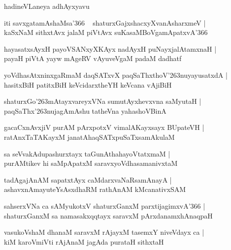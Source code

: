 \documentclass[twoside,12pt,openright]{book}
\def\S{\char'263}
\newcounter{shloka}[chapter]
\begin{document}
\begin{center}
hadineVLaneya adhAyxyavu
\end{center}

\begin{shloka}%
iti savxgatamAshaMsa\char'366 ~ shaturxGajxshacxyXvanAsharxmeV |\\
kaSxNaM sithxtAvx jalaM piVtAvx suKasaMBoVgamApatxvA\char'366 
\end{shloka}

\begin{shloka}%
hayasatxsAyxH payoVSANxyXKAyx nadAyxH puNayxjalAtamxnaH |\\
payaH piVtA yayw mAgeRV vAyuveVgaM padaM dadhatf
\end{shloka}

\begin{shloka}%
yoVdhasAtxninxgaRmaM daqSATxvX paqSaThxthoV\S nuyayusatxdA |\\
hasitxBiH patitxBiH keVcidarxtheYH keVcana vAjiBiH 
\end{shloka}

\begin{shloka}%
shaturxGo\S mAtayxvareyxVNa sumutAyxhevxvna saMyutaH |\\
paqSaThx\S nujagAmAshu tatheVna yahashoVBinA
\end{shloka}

\begin{shloka}%
gacaCxnAvxjiV purAM pArxpotxV vimalAKayxsayx BUpateVH |\\
ratAnxTaTAKayxM janatAhaqSATxpuSaTxsamAkulaM
\end{shloka}

\begin{shloka}%
sa seVvakAdupashurxtayx taGunAthahayoVtatxmaM |\\
purAMtikev hi saMpApatxM saravxyoVdhasamanivxtaM
\end{shloka}

\begin{shloka}%
tadAgajAnAM sapatxtAyx caMdarxvaNaRsamAnayA |\\
ashavxnAmayuteYsAsxdhaRM rathAnAM kMcanativxSAM 
\end{shloka}

\begin{shloka}%
sahserxVNa ca sAMyukotxV shaturxGanxM parxtijagimxvA\char'366 |\\
shaturxGanxM sa namasakxqqtayx saravxM pArxdanamxhAnaqpaH 
\end{shloka}

\begin{shloka}%
vasukoVshaM dhanaM saravxM rAjayxM tasemxY niveVdayx ca |\\
kiM karoVmiVti rAjAnaM jagAda purataH sithxtaH 
\end{shloka}
\end{document}
